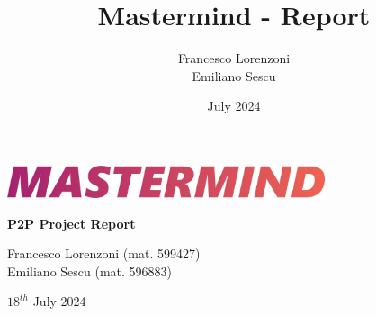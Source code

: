 

\title{Mastermind - Report}
\author{Francesco Lorenzoni\\Emiliano Sescu}
\date{July 2024}



\begin{titlepage}
    \begin{center}
        \vspace*{2.25in} %
        
        \includegraphics[width=0.7\textwidth]{images/Mastermind_Logo_NoBorder_alpha.jpg} %
        
        \vspace{1in}
        
        {\LARGE \textbf{P2P Project Report}} %
        
        \vspace{0.5in}
        
        {\large Francesco Lorenzoni (mat. 599427)\\Emiliano Sescu (mat. 596883)}
        
        \vspace{0.5in}
        
        {\large $18^{th}$ July 2024}

        \vspace{1in}

    \end{center}
\end{titlepage}

\newpage

\tableofcontents








